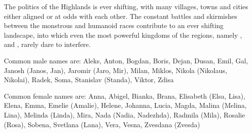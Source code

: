
The politics of the Highlands is ever shifting, with many villages, towns
and cities either aligned or at odds with each other. The constant battles
and skirmishes between the monstrous and humanoid races contribute to an
ever shifting landscape, into which even the most powerful kingdoms of the
regions, namely ,  and
, rarely dare to interfere.

Common male names are: Aleks, Anton, Bogdan, Boris, Dejan, Dusan, Emil,
Gal, Janosh (Janos, Jan), Jaromir (Jaro, Mir), Milan, Miklos, Nikola
(Nikolaus, Nikolai), Radek, Soma, Stanislav (Standa), Viktor, Zdisa

Common female names are: Anna, Abigel, Bianka, Brana, Elisabeth (Elsa, Lisa),
Elena, Emma, Emelie (Amalie), Helene, Johanna, Lucia, Magda, Malina (Melina,
Lina), Melinda (Linda), Mira, Nada (Nadia, Nadezhda), Radmila (Mila), Rosalie
(Rosa), Sobena, Svetlana (Lana), Vera, Vesna, Zvesdana (Zvesda)
